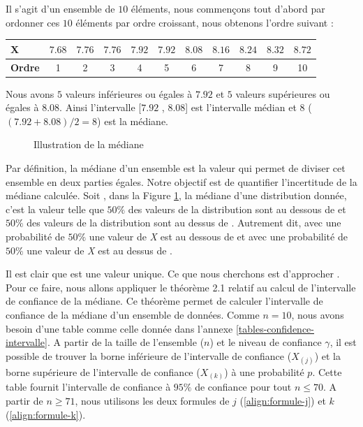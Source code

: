 Il s'agit d'un ensemble de $10$ éléments, nous commençons tout d'abord par ordonner ces $10$ éléments  par ordre croissant, nous obtenons l'ordre suivant :

\begin{table}[H]
	\centering
	\begin{tabular}{lccccc!{\color{red}\vrule}ccccc}
		\textbf{X}&	$ 7.68 $& $ 7.76 $& $ 7.76 $& $ 7.92 $& $ 7.92 $& $ 8.08  $& $ 8.16 $& $ 8.24 $& $ 8.32 $& $ 8.72 $\\ \hline
		\textbf{Ordre}&	1&2&3&4&5&6&7&8&9&10\\
	\end{tabular}
\end{table}

Nous avons $5$ valeurs inférieures ou égales à  $7.92$ et $5$ valeurs supérieures ou égales à $ 8.08 $. Ainsi l'intervalle [$ 7.92 $ , $ 8.08 $] est l'intervalle médian
et   $8$ ( $(7.92 + 8.08)/2 = 8 $) est la médiane.
\begin{figure}
	\captionsetup{justification=centering}
	
	\resizebox{.4\textwidth}{!}{
		
		
	}
	\caption{Illustration de la médiane}\label{fig:medianIllustration}
\end{figure} 
Par définition, la médiane d'un ensemble est la valeur qui permet de diviser cet ensemble en deux parties égales. Notre objectif est de quantifier  l'incertitude de la médiane calculée.
Soit \textmu, dans la Figure \ref{fig:medianIllustration},  la médiane d'une distribution donnée, c'est la valeur telle que $50\%$ des valeurs de la distribution sont au dessous de {\textmu}  et $50\%$ des valeurs de la distribution sont au dessus de  \textmu. Autrement dit, avec une probabilité de $50\%$ une valeur de \textit{X} est au dessous de {\textmu}  et avec une probabilité de $50\%$ une valeur de \textit{X} est au dessus de \textmu.


Il est clair que {\textmu} est une valeur unique. Ce que nous cherchons est d'approcher {\textmu}. Pour ce faire, nous allons appliquer le théorème 2.1 relatif au calcul de l'intervalle de confiance de la médiane. Ce théorème permet de calculer l'intervalle de confiance de la médiane d'un ensemble de données. Comme $n = 10 $, nous avons besoin d'une table comme celle  donnée dans l'annexe \ref{tables-confidence-intervalle}. A partir de la taille de l'ensemble ($n$) et le niveau de confiance $\gamma$, il est possible de trouver la borne inférieure de l'intervalle de confiance ($X_{(j)}$) et la borne supérieure de l'intervalle de confiance ($X_{(k)}$) à une probabilité $p$. Cette table fournit l'intervalle de confiance à $95 \%$ de confiance pour tout $n \leq 70$. A partir de $n \geq 71$, nous utilisons les deux formules de $ j $ (\ref{align:formule-j}) et $ k $ (\ref{align:formule-k}).

